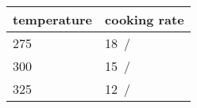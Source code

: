 \begin{center}
	\begin{tabular}{ll}\toprule
		\textbf{temperature}  &  \textbf{cooking rate} \\ \midrule
		275~\Fahrenheit       &  18~\minute/\pound\\
		300~\Fahrenheit       &  15~\minute/\pound\\
		325~\Fahrenheit       &  12~\minute/\pound\\  \bottomrule
	\end{tabular}
\end{center}


\recipeend%
